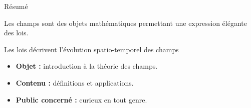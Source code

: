 \begin{center}
\Large
Résumé
\normalsize
\end{center}


Les champs sont des objets mathématiques permettant une expression élégante des lois.



Les lois décrivent l'évolution spatio-temporel des champs



\vspace{3cm}
\begin{itemize}[leftmargin=1cm, label=, itemsep=21pt]
\item {\bf Objet :} introduction à la théorie des champs.
\item {\bf Contenu :} définitions et applications.
\item {\bf Public concerné :} curieux en tout genre.
\end{itemize}

\vspace{3cm}

\vspace{3cm}

